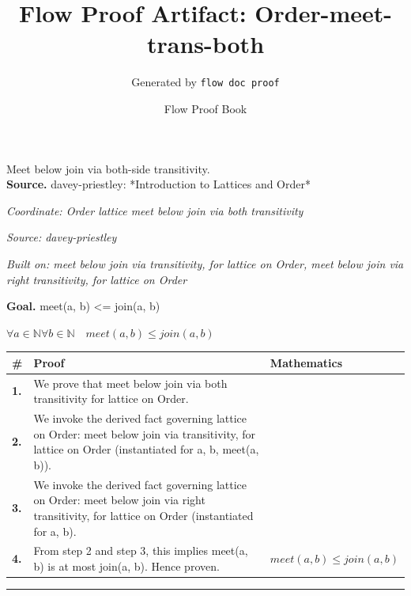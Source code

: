 \documentclass[11pt]{article}
\title{Flow Proof Artifact: Order-meet-trans-both}
\author{Generated by \texttt{flow doc proof}}
\date{Flow Proof Book}
\theoremstyle{definition}
\begin{document}
\maketitle
Meet below join via both-side transitivity.\\[0.5em]
\textbf{Source.} davey-priestley: *Introduction to Lattices and Order*\\[0.5em]
\bigskip
{}\par
\smallskip\noindent\textit{Coordinate: Order \cdot lattice \cdot meet below join via both transitivity}\par
\smallskip\noindent\textit{Source: davey-priestley}\par
\smallskip\noindent\textit{Built on: meet below join via transitivity, for lattice on Order, meet below join via right transitivity, for lattice on Order}\par
\medskip
\noindent\textbf{Goal.} meet(a, b) <= join(a, b)\par
\noindent$\displaystyle \forall a \in \mathbb{N} \forall b \in \mathbb{N}\quad meet(a, b) \le join(a, b)$\par
\medskip
\noindent
\begin{tabular}{@{} >{\raggedright\arraybackslash}p{} >{\raggedright\arraybackslash}p{} >{\raggedleft\arraybackslash}p{} @{}}
\textbf{\#} & \textbf{Proof} & \textbf{Mathematics} \\
\midrule
\textbf{1.} & We prove that meet below join via both transitivity for lattice on Order. & \\[0.45em]
\textbf{2.} & We invoke the derived fact governing lattice on Order: meet below join via transitivity, for lattice on Order (instantiated for a, b, meet(a, b)). & \\[0.45em]
\textbf{3.} & We invoke the derived fact governing lattice on Order: meet below join via right transitivity, for lattice on Order (instantiated for a, b). & \\[0.45em]
\textbf{4.} & From step 2 and step 3, this implies meet(a, b) is at most join(a, b). Hence proven. & $\displaystyle meet(a, b) \le join(a, b)$ \\[0.45em]
\bottomrule
\end{tabular}
\label{thm:Order-lattice-meet_below_join_via_both_transitivity}
\par\medskip\hrule
\end{document}

